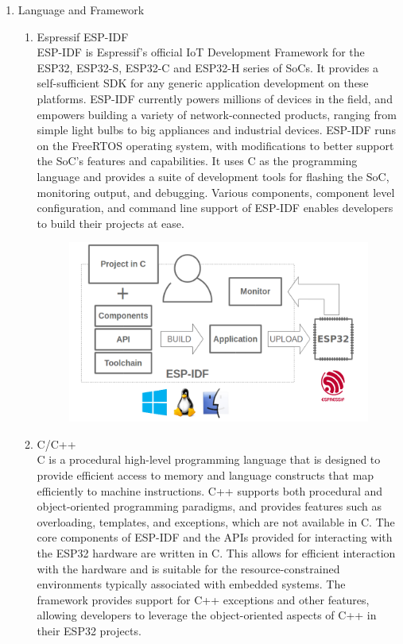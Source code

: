 \documentclass[conference]{IEEEtran}
\begin{document}
\begin{enumerate}[label=\arabic*.]
\item Language and Framework\\
\begin{enumerate}[label=\alph*.]
\item Espressif ESP-IDF\\
ESP-IDF is Espressif’s official IoT Development Framework for the ESP32, ESP32-S, ESP32-C and ESP32-H series of SoCs. It provides a self-sufficient SDK for any generic application development on these platforms. ESP-IDF currently powers millions of devices in the field, and empowers building a variety of network-connected products, ranging from simple light bulbs to big appliances and industrial devices. ESP-IDF runs on the FreeRTOS operating system, with modifications to better support the SoC's features and capabilities. It uses C as the programming language and provides a suite of development tools for flashing the SoC, monitoring output, and debugging. Various components, component level configuration, and command line support of ESP-IDF enables developers to build their projects at ease.\\
\begin{figure}[H]\centering \includegraphics[scale=0.33]{images/esp-idf.png}\end{figure}
\item C/C++\\
C is a procedural high-level programming language that is designed to provide efficient access to memory and language constructs that map efficiently to machine instructions. C++ supports both procedural and object-oriented programming paradigms, and provides features such as overloading, templates, and exceptions, which are not available in C. The core components of ESP-IDF and the APIs provided for interacting with the ESP32 hardware are written in C. This allows for efficient interaction with the hardware and is suitable for the resource-constrained environments typically associated with embedded systems. The framework provides support for C++ exceptions and other features, allowing developers to leverage the object-oriented aspects of C++ in their ESP32 projects.\\

\end{enumerate}
\end{enumerate}
\end{document}
